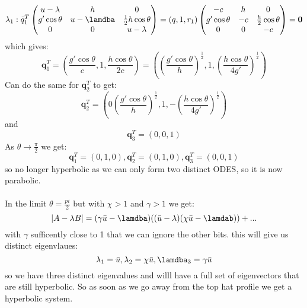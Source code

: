 \documentclass{article}
\begin{document}
$$
 \lambda_1: \bar q_1^{T} \begin{pmatrix} u-\lambda & h & 0 \\ g' \cos \theta & u-\lamdba & \frac{1}{2} h \cos \theta \\ 0 & 0 & u - \lambda \end{pmatrix} = ( q , 1, r_1) \begin{pmatrix} - c & h & 0 \\ g' \cos \theta & - c & \frac{h}{2} \cos \theta \\ 0 & 0 & -c \end{pmatrix} = \bm 0
$$
which gives:
$$
 \bm q_1^T = ( \frac{g' \cos \theta}{c} , 1, \frac{h \cos \theta}{2 c}) = ( ( \frac{g' \cos \theta}{h})^{\frac{1}{2}}, 1, ( \frac{h \cos \theta}{4 g'})^{\frac{1}{2}})
$$
Can do the same for $\bm q_2^T $ to get:
$$
 \bm q_2^T = ( 0( \frac{g' \cos \theta}{h})^{\frac{1}{2}}, 1, -( \frac{h \cos \theta}{4 g'})^{\frac{1}{2}})
$$
and 
$$
 \bm q_3^T = (0,0,1)
$$
As $\theta \rightarrow \frac{\pi}{2}$ we get:
$$
 \bm q_1^T = ( 0,1,0), \bm q_2^T = (0,1,0), \bm q_3^T = (0,0,1)
$$
so no longer hyperbolic as we can only form two distinct ODES, so it is now parabolic.\\\\
In the limit $\theta = \frac{pi}{2}$ but with $\chi >1$ and $\gamma >1$ we get:
$$
|A- \lambda B| = (\gamma \bar u - \lamdba) ( (\bar u - \lambda) ( \chi \bar u - \lamdab)) + ...
$$
with $\gamma$ sufficently close to 1 that we can ignore the other bits. this will give us distinct eigenvlaues:
$$
 \lambda_1 = \bar u, \lambda_2 = \chi \bar u, \lamdba_3 = \gamma \bar u
$$
so we have three distinct eigenvalues and willl have a full set of eigenvectors that are still hyperbolic. So as soon as we go away from the top hat profile we get a hyperbolic system.
\end{document}
